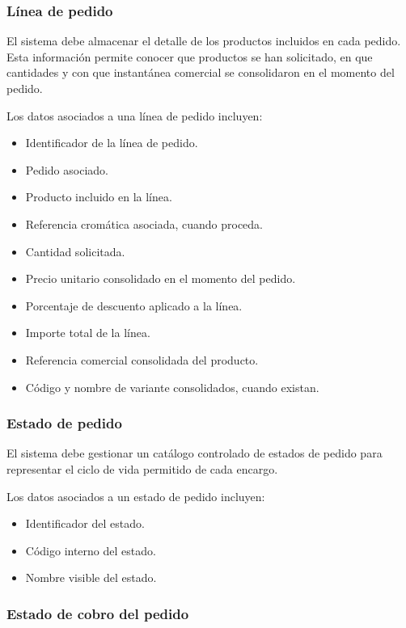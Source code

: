 \subsubsection*{Línea de pedido}

El sistema debe almacenar el detalle de los productos incluidos en cada pedido. Esta información permite conocer que productos se han solicitado, en que cantidades y con que instantánea comercial se consolidaron en el momento del pedido.

Los datos asociados a una línea de pedido incluyen:

\begin{itemize}
    \item Identificador de la línea de pedido.
    \item Pedido asociado.
    \item Producto incluido en la línea.
    \item Referencia cromática asociada, cuando proceda.
    \item Cantidad solicitada.
    \item Precio unitario consolidado en el momento del pedido.
    \item Porcentaje de descuento aplicado a la línea.
    \item Importe total de la línea.
    \item Referencia comercial consolidada del producto.
    \item Código y nombre de variante consolidados, cuando existan.
\end{itemize}

\subsubsection*{Estado de pedido}

El sistema debe gestionar un catálogo controlado de estados de pedido para representar el ciclo de vida permitido de cada encargo.

Los datos asociados a un estado de pedido incluyen:

\begin{itemize}
    \item Identificador del estado.
    \item Código interno del estado.
    \item Nombre visible del estado.
\end{itemize}

\subsubsection*{Estado de cobro del pedido}


